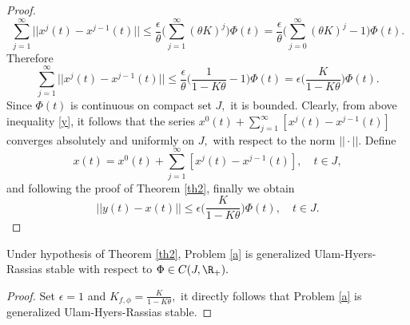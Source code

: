 \begin{proof}
\begin{equation*}
\sum_{j=1}^{\infty}||x^{j}(t)-x^{j-1}(t)||\leq\frac{\epsilon}{\theta}\bigg(\sum_{j=1}^{\infty}(\theta K)^{j}\bigg)\Phi(t)=\frac{\epsilon}{\theta}\bigg(\sum_{j=0}^{\infty}(\theta K)^{j}-1\bigg)\Phi(t).
\end{equation*}
Therefore
\begin{equation}\label{y}
\sum_{j=1}^{\infty}||x^{j}(t)-x^{j-1}(t)||\leq\frac{\epsilon}{\theta}\bigg(\frac{1}{1-K\theta}-1\bigg)\Phi(t)=\epsilon\bigg(\frac{K}{1-K\theta}\bigg)\Phi(t).
\end{equation}
Since $\Phi(t)$ is continuous on compact set ${J},$ it is bounded. Clearly, from above inequality \eqref{y}, it follows that the series $x^{0}(t)+\sum_{j=1}^{\infty}[x^j(t)-x^{j-1}(t)]$ converges absolutely and uniformly on ${J},$ with respect to the norm $||\cdot||.$ Define
\begin{equation}\label{z}
x(t)=x^{0}(t)+\sum_{j=1}^{\infty}[x^j(t)-x^{j-1}(t)],\quad t\in{J},
\end{equation}
and following the proof of Theorem \ref{th2}, finally we obtain
\begin{equation*}
||y(t)-x(t)||\leq\epsilon\bigg(\frac{K}{1-K\theta}\bigg)\Phi(t),\quad t\in{J}.
\end{equation*}
\end{proof}
\begin{cor}\label{c1}
Under hypothesis of Theorem \ref{th2}, Problem \eqref{a} is generalized Ulam-Hyers-Rassias stable with respect to $\Phi\in{C}(J,{\R}_+).$
\end{cor}
\begin{proof}
Set $\epsilon=1$ and $K_{f,\phi}=\frac{K}{1-K\theta},$ it directly follows that Problem \eqref{a} is generalized Ulam-Hyers-Rassias stable.
\end{proof}

